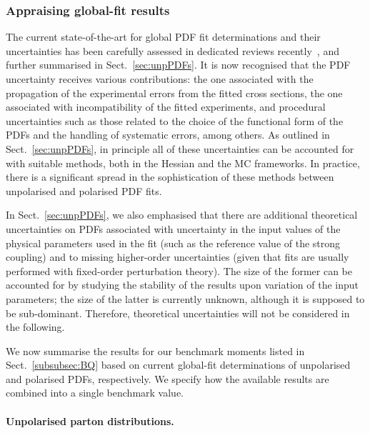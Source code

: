 \subsubsection{Appraising global-fit results}
\label{subsubsec:GPDFfits}

The current state-of-the-art for global PDF fit determinations and their 
uncertainties has been carefully assessed in dedicated reviews
recently~\cite{Forte:2013wc,Jimenez-Delgado:2013sma}, and further 
summarised in Sect.~\ref{sec:unpPDFs}. 
%
It is now recognised that the PDF uncertainty receives various contributions: 
the one associated with the propagation of the
experimental errors from the fitted cross sections,
the one associated with incompatibility of the 
fitted experiments, and procedural uncertainties such as those related to the choice of the
functional form of the PDFs and the handling of systematic errors, among others.
%
As outlined in Sect.~\ref{sec:unpPDFs}, in principle all of these uncertainties 
can be accounted for with suitable methods, both in the Hessian and the 
MC frameworks.
%
In practice, there is a significant spread in the sophistication 
of these methods between unpolarised and polarised PDF fits.

In Sect.~\ref{sec:unpPDFs}, we also emphasised that there are additional 
theoretical uncertainties on PDFs associated with uncertainty in
the input values of the physical parameters used in the fit (such as the 
reference value of the strong coupling) and to missing higher-order
uncertainties (given that fits are usually performed with fixed-order
perturbation theory).
%
The size of the former can be accounted for by studying the stability of the 
results upon variation of the input parameters; the size of the latter is
currently unknown, although it is supposed to be sub-dominant.
%
Therefore, theoretical uncertainties will not be considered in the following.

We now summarise the results for our benchmark moments listed in 
Sect.~\ref{subsubsec:BQ} based on current global-fit determinations of
unpolarised and polarised PDFs, respectively.
%
We specify how the
available results are combined into a single benchmark value.

\paragraph{Unpolarised parton distributions.}

